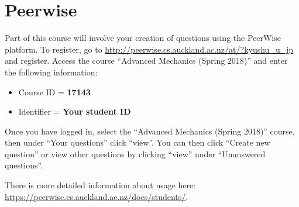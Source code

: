 \newpage
\section{Peerwise}
\label{sec:peerwise}

Part of this course will involve your creation of questions using the PeerWise platform.
To register, go to \url{http://peerwise.cs.auckland.ac.nz/at/?kyushu_u_jp} and register.
Access the course ``Advanced Mechanics (Spring 2018)'' and enter the following information:

\begin{itemize}
    \item Course ID = \textbf{17143}
    \item Identifier = \textbf{Your student ID}
\end{itemize}

Once you have logged in, select the ``Advanced Mechanics (Spring 2018)'' course, then under ``Your questions'' click ``view''. You can then click ``Create new question'' or view other questions by clicking ``view'' under ``Unanswered questions''.

There is more detailed information about usage here: \url{https://peerwise.cs.auckland.ac.nz/docs/students/}.

